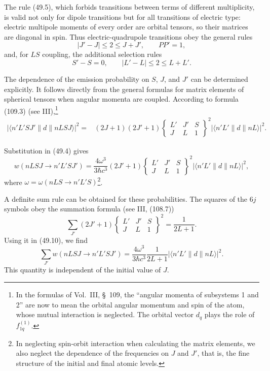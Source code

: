 The rule (49.5), which forbids transitions between terms of different multiplicity, is valid not only for dipole transitions but for all transitions of electric type: electric multipole moments of every order are orbital tensors, so their matrices are diagonal in spin. Thus electric-quadrupole transitions obey the general rules
\begin{equation}
|J'-J|\leq2\leq J+J',
\qquad
PP'=1,
\tag{49.7}
\end{equation}
and, for $LS$ coupling, the additional selection rules
\begin{equation}
S'-S=0,
\qquad
|L'-L|\leq2\leq L+L'.
\tag{49.8}
\end{equation}

The dependence of the emission probability on $S$, $J$, and $J'$ can be determined explicitly. It follows directly from the general formulas for matrix elements of spherical tensors when angular momenta are coupled. According to formula (109.3) (see III),\footnote{In the formulas of Vol.~III, \S~109, the “angular momenta of subsystems 1 and 2” are now to mean the orbital angular momentum and spin of the atom, whose mutual interaction is neglected. The orbital vector $d_q$ plays the role of $f_{1q}^{(1)}$.}
\begin{equation}
\begin{aligned}
|\langle n'L'SJ'\|d\|nLSJ\rangle|^2={}&(2J+1)(2J'+1)
\begin{Bmatrix}L'&J'&S\\J&L&1\end{Bmatrix}^{\!2}
|\langle n'L'\|d\|nL\rangle|^2.
\end{aligned}
\tag{49.9}
\end{equation}

Substitution in (49.4) gives
\begin{equation}
w(nLSJ\to n'L'SJ')=\frac{4\omega^3}{3\hbar c^3}(2J'+1)
\begin{Bmatrix}L'&J'&S\\J&L&1\end{Bmatrix}^{\!2}
|\langle n'L'\|d\|nL\rangle|^2,
\tag{49.10}
\end{equation}
where $\omega=\omega(nLS\to n'L'S)$\footnote{In neglecting spin-orbit interaction when calculating the matrix elements, we also neglect the dependence of the frequencies on $J$ and $J'$, that is, the fine structure of the initial and final atomic levels.}.

A definite sum rule can be obtained for these probabilities. The squares of the $6j$ symbols obey the summation formula (see III, (108.7))
\begin{equation}
\sum_{J'}(2J'+1)
\begin{Bmatrix}L'&J'&S\\J&L&1\end{Bmatrix}^{\!2}
=\frac1{2L+1}.
\tag{49.11}
\end{equation}
Using it in (49.10), we find
\begin{equation}
\sum_{J'}w(nLSJ\to n'L'SJ')
=\frac{4\omega^3}{3\hbar c^3}\frac1{2L+1}
|\langle n'L'\|d\|nL\rangle|^2.
\tag{49.12}
\end{equation}
This quantity is independent of the initial value of $J$.

